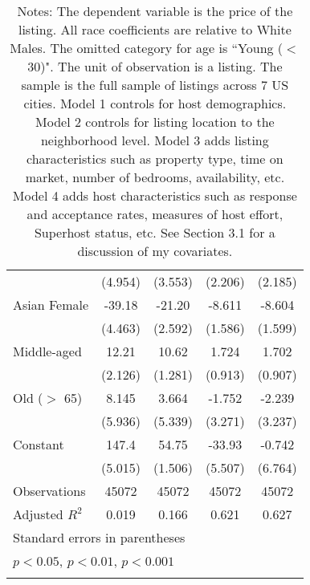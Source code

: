 {\begin{longtable}{l*{4}{c}}
                    &     (4.954)         &     (3.553)         &     (2.206)         &     (2.185)         \\
[1em]
Asian Female        &      -39.18\sym{***}&      -21.20\sym{***}&      -8.611\sym{***}&      -8.604\sym{***}\\
                    &     (4.463)         &     (2.592)         &     (1.586)         &     (1.599)         \\
[1em]
Middle-aged         &       12.21\sym{***}&       10.62\sym{***}&       1.724         &       1.702         \\
                    &     (2.126)         &     (1.281)         &     (0.913)         &     (0.907)         \\
[1em]
Old ($>$ 65)           &       8.145         &       3.664         &      -1.752         &      -2.239         \\
                    &     (5.936)         &     (5.339)         &     (3.271)         &     (3.237)         \\
[1em]
Constant            &       147.4\sym{***}&       54.75\sym{***}&      -33.93\sym{***}&      -0.742         \\
                    &     (5.015)         &     (1.506)         &     (5.507)         &     (6.764)         \\
\hline
Observations        &       45072         &       45072         &       45072         &       45072         \\
Adjusted \(R^{2}\)  &       0.019         &       0.166         &       0.621         &       0.627         \\
\hline\hline
\multicolumn{5}{l}{\footnotesize Standard errors in parentheses}\\
\multicolumn{5}{l}{\footnotesize \sym{*} \(p<0.05\), \sym{**} \(p<0.01\), \sym{***} \(p<0.001\)}\\
\caption*{Notes: The dependent variable is the price of the listing. All race coefficients are relative to White Males. The omitted category for age is ``Young ($<$ 30)". The unit of observation is a listing. The sample is the full sample of listings across 7 US cities. Model 1 controls for host demographics. Model 2 controls for listing location to the neighborhood level. Model 3 adds listing characteristics such as property type, time on market, number of bedrooms, availability, etc. Model 4 adds host characteristics such as response and acceptance rates, measures of host effort, Superhost status, etc. See Section 3.1 for a discussion of my covariates. }
\label{Table 4}


\end{longtable}
}


